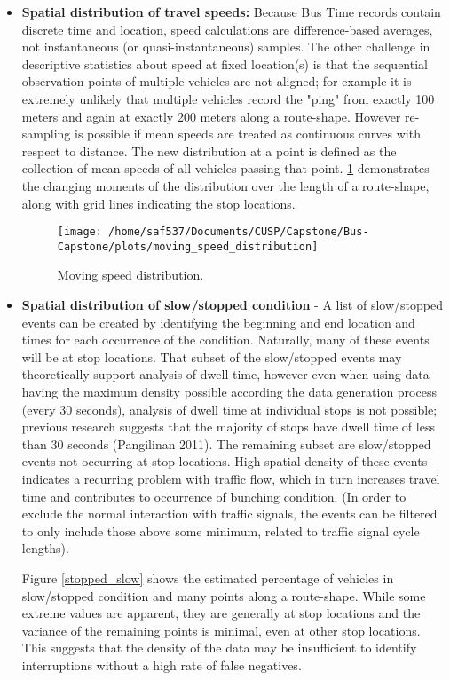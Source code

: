 \documentclass[12pt]{report}
\begin{document}
\begin{itemize}
\item \textbf{Spatial distribution of travel speeds:} Because Bus Time records contain discrete time and location, speed calculations are difference-based averages, not instantaneous (or quasi-instantaneous) samples.  The other challenge in descriptive statistics about speed at fixed location(s) is that the sequential observation points of multiple vehicles are not aligned; for example it is extremely unlikely that multiple vehicles record the "ping" from exactly 100 meters and again at exactly 200 meters along a route-shape.  However re-sampling is possible if mean speeds are treated as continuous curves with respect to distance.  The new distribution at a point is defined as the collection of mean speeds of all vehicles passing that point.  \ref{msd} demonstrates the changing moments of the distribution over the length of a route-shape, along with grid lines indicating the stop locations.

\begin{center}
\begin{figure}[!ht]
  \caption{Moving speed distribution.}
  \label{msd}
  \centering
    \texttt{[image: /home/saf537/Documents/CUSP/Capstone/Bus-Capstone/plots/moving\_speed\_distribution]}
\end{figure}
\end{center}

\item \textbf{Spatial distribution of slow/stopped condition} - A list of slow/stopped events can be created by identifying the beginning and end location and times for each occurrence of the condition.  Naturally, many of these events will be at stop locations.   That subset of the slow/stopped events may theoretically support analysis of dwell time, however even when using data having the maximum density possible according the data generation process (every 30 seconds), analysis of dwell time at individual stops is not possible; previous research suggests that the majority of stops have dwell time of less than 30 seconds (Pangilinan 2011).  The remaining subset are slow/stopped events not occurring at stop locations.  High spatial density of these events indicates a recurring problem with traffic flow, which in turn increases travel time and contributes to occurrence of bunching condition.  (In order to exclude the normal interaction with traffic signals, the events can be filtered to only include those above some minimum, related to traffic signal cycle lengths).

Figure \ref{stopped_slow} shows the estimated percentage of vehicles in slow/stopped condition and many points along a route-shape.  While some extreme values are apparent, they are generally at stop locations and the variance of the remaining points is minimal, even at other stop locations.  This suggests that the density of the data may be insufficient to identify interruptions without a high rate of false negatives.




\end{itemize}
\end{document}
